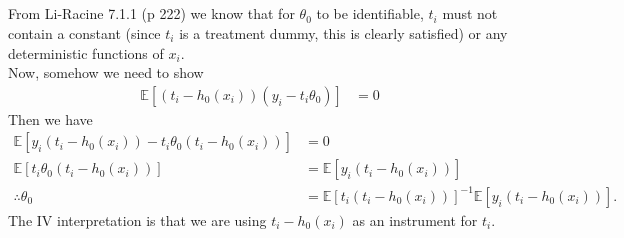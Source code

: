 \documentclass[12pt]{article}
\newcommand{\E}{\mathbb{E}}
\newcommand{\mtx}[1]{\ensuremath{\bm{\mathit{#1}}}}
\begin{document}
\subsection{}
From Li-Racine 7.1.1 (p 222) we know that for $\theta_0$ to be identifiable, $t_i$ must not contain a constant (since $t_i$ is a treatment dummy, this is clearly satisfied) or any deterministic functions of $\mtx{x}_i$. \\

Now, somehow we need to show
\begin{align*}
\E[(t_i-h_0(\mtx{x}_i))(y_i - t_i\theta_0)]&=0
\end{align*}
Then we have
\begin{align*}
\E[y_i (t_i-h_0(\mtx{x}_i))- t_i\theta_0(t_i-h_0(\mtx{x}_i))]&=0\\
\E[t_i\theta_0(t_i-h_0(\mtx{x}_i))] &= \E[y_i (t_i-h_0(\mtx{x}_i))]\\
\therefore \theta_0 &= \E[t_i(t_i-h_0(\mtx{x}_i))]^{-1}\E[y_i (t_i-h_0(\mtx{x}_i))].
\end{align*}
The IV interpretation is that we are using $t_i-h_0(\mtx{x}_i)$ as an instrument for $t_i$.
\end{document}

